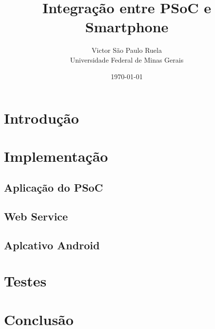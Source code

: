 \documentclass[a4paper,12pt,titlepage]{article}
\title{\textbf{ \Huge{Integração entre PSoC e Smartphone}}\\}
\author{Victor São Paulo Ruela\\
	Universidade Federal de Minas Gerais}
\date{\today}
\begin{document}
\maketitle

\tableofcontents
\newpage

\section{Introdução}
\section{Implementação}
	\subsection{Aplicação do PSoC}
	\subsection{Web Service}
	\subsection{Aplcativo Android}
\section{Testes}
\section{Conclusão}
\end{document}
